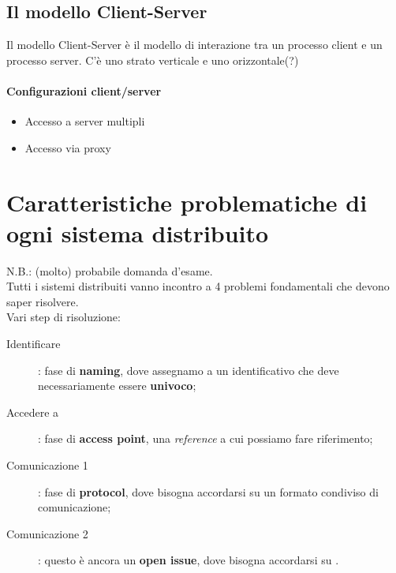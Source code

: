 \section{Il modello Client-Server}
Il modello Client-Server è il modello di interazione tra un processo client e un processo server.
C'è uno strato verticale e uno orizzontale(?)
\subsubsection{Configurazioni client/server}
\begin{itemize}
    \item Accesso a server multipli
    \item Accesso via proxy
\end{itemize}

\chapter{Caratteristiche problematiche di ogni sistema distribuito}
N.B.: (molto) probabile domanda d'esame.
\\Tutti i sistemi distribuiti vanno incontro a 4 problemi fondamentali che devono saper risolvere.
\\Vari step di risoluzione:
\begin{description}
    \item[Identificare ]: fase di \textbf{naming}, dove assegnamo a  un identificativo che deve necessariamente essere \textbf{univoco}; 
    \item[Accedere a ]: fase di \textbf{access point}, una \textit{reference} a cui possiamo fare riferimento;
    \item[Comunicazione 1]: fase di \textbf{protocol}, dove bisogna accordarsi su un formato condiviso di comunicazione;
    \item[Comunicazione 2]: questo è ancora un \textbf{open issue}, dove bisogna accordarsi su .
\end{description}